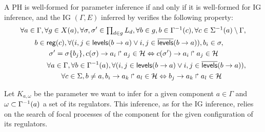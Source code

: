 \begin{property}\label{pro:wf-ph-K}
A PH is well-formed for parameter inference if and only if
it is well-formed for IG inference, and
the IG $(\Gamma, E)$ inferred by 
verifies the following property:
\begin{align*}
  \begin{split}
      &
    \forall a \in \Gamma,
    \forall g \in X(a),
    \forall \sigma, \sigma' \in \textstyle\prod_{d \in g} L_d,
    \forall b \in g,
    b \in \Gamma^{-1}(c),
    \forall c \in \Sigma^{-1}(a) \setminus \Gamma,
      \\&\qquad
    b \in \mathsf{reg}({c}),
    \forall (i,j \in \mathsf{levels}(b\rightarrow a) \vee i,j \in \overline{\mathsf{levels}}(b\rightarrow a)),
    b_i \in \sigma,
      \\&\qquad\qquad
    \sigma' = \sigma\{b_j\},
    c(\sigma)\rightarrow a_i\Rsh a_j \in \mathcal{H} \Leftrightarrow
    c(\sigma')\rightarrow a_i\Rsh a_j \in \mathcal{H}
  \end{split}\\
  \begin{split}
    & \forall a \in \Gamma, \forall b \in \Gamma^{-1}(a),
      \forall (i,j \in \mathsf{levels}(b\rightarrow a) \vee i,j \in \overline{\mathsf{levels}}(b\rightarrow a)), \\
    & \qquad \forall c \in \Sigma, b \neq a,
      b_i\rightarrow a_k\Rsh a_l \in \mathcal{H} \Leftrightarrow
      b_j\rightarrow a_k\Rsh a_l \in \mathcal{H}
  \end{split}
\end{align*}
\end{property}

Let $K_{a,\omega}$ be the parameter we want to infer for a given component $a \in \Gamma$
and $\omega \subset \Gamma^{-1}(a)$ a set of its regulators.
This inference, as for the IG inference, relies on the search of focal processes of the component for the given configuration of its regulators.

